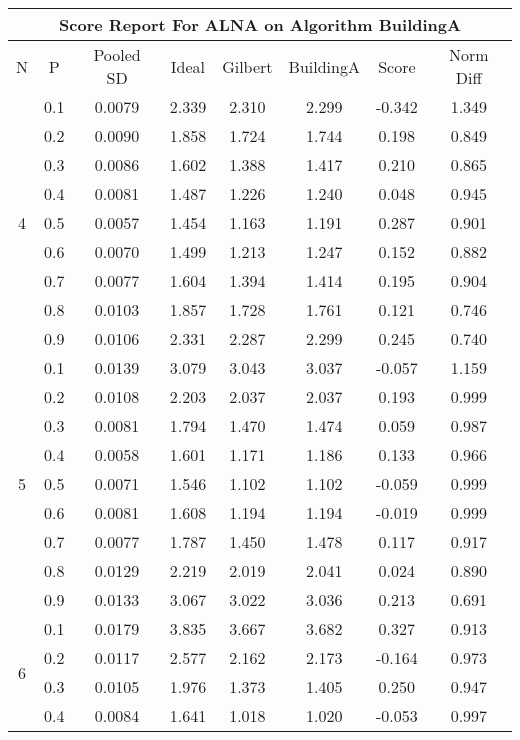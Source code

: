 \documentclass[11pt,a4paper]{report}
\begin{document}
\begin{longtable}{ | c | c || c | c | c | c | c | c | }
\hline
\multicolumn{8}{|c|}{ Score Report For ALNA on Algorithm BuildingA} \\
\hline
N & P & Pooled SD &  Ideal &  Gilbert & BuildingA  & Score & Norm Diff \\
 \hline
 \hline
 \endhead
\multirow{9}{*}{4} & 0.1 & 0.0079 & 2.339 & 2.310 & 2.299 & -0.342 & 1.349 \\
 & 0.2 & 0.0090 & 1.858 & 1.724 & 1.744 & 0.198 & 0.849 \\
 & 0.3 & 0.0086 & 1.602 & 1.388 & 1.417 & 0.210 & 0.865 \\
 & 0.4 & 0.0081 & 1.487 & 1.226 & 1.240 & 0.048 & 0.945 \\
 & 0.5 & 0.0057 & 1.454 & 1.163 & 1.191 & 0.287 & 0.901 \\
 & 0.6 & 0.0070 & 1.499 & 1.213 & 1.247 & 0.152 & 0.882 \\
 & 0.7 & 0.0077 & 1.604 & 1.394 & 1.414 & 0.195 & 0.904 \\
 & 0.8 & 0.0103 & 1.857 & 1.728 & 1.761 & 0.121 & 0.746 \\
 & 0.9 & 0.0106 & 2.331 & 2.287 & 2.299 & 0.245 & 0.740 \\
 \hline
\multirow{9}{*}{5} & 0.1 & 0.0139 & 3.079 & 3.043 & 3.037 & -0.057 & 1.159 \\
 & 0.2 & 0.0108 & 2.203 & 2.037 & 2.037 & 0.193 & 0.999 \\
 & 0.3 & 0.0081 & 1.794 & 1.470 & 1.474 & 0.059 & 0.987 \\
 & 0.4 & 0.0058 & 1.601 & 1.171 & 1.186 & 0.133 & 0.966 \\
 & 0.5 & 0.0071 & 1.546 & 1.102 & 1.102 & -0.059 & 0.999 \\
 & 0.6 & 0.0081 & 1.608 & 1.194 & 1.194 & -0.019 & 0.999 \\
 & 0.7 & 0.0077 & 1.787 & 1.450 & 1.478 & 0.117 & 0.917 \\
 & 0.8 & 0.0129 & 2.219 & 2.019 & 2.041 & 0.024 & 0.890 \\
 & 0.9 & 0.0133 & 3.067 & 3.022 & 3.036 & 0.213 & 0.691 \\
 \hline
\multirow{9}{*}{6} & 0.1 & 0.0179 & 3.835 & 3.667 & 3.682 & 0.327 & 0.913 \\
 & 0.2 & 0.0117 & 2.577 & 2.162 & 2.173 & -0.164 & 0.973 \\
 & 0.3 & 0.0105 & 1.976 & 1.373 & 1.405 & 0.250 & 0.947 \\
 & 0.4 & 0.0084 & 1.641 & 1.018 & 1.020 & -0.053 & 0.997 \\

\end{longtable}
\end{document}

